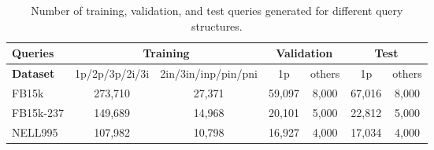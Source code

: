 \begin{table}[!h]
\caption{Average number of answers of test queries in our new dataset.}
\label{tab:meta_new_query}
\end{table}

\begin{table*}[!h]
\centering
\small
\begin{tabular}{|l|c|c|c|c|c|c|}
\hline
         \textbf{Queries} & \multicolumn{2}{c|}{\textbf{Training}} & \multicolumn{2}{c|}{\textbf{Validation}} & \multicolumn{2}{c|}{\textbf{Test}} \\ \hline
\textbf{Dataset}     & 1p/2p/3p/2i/3i               & 2in/3in/inp/pin/pni           & 1p              & others          & 1p               & others          \\ \hline
FB15k     & 273,710          & 27,371          & 59,097          & 8,000           & 67,016           & 8,000           \\ \hline
FB15k-237 & 149,689          & 14,968          & 20,101          & 5,000           & 22,812           & 5,000           \\ \hline
NELL995     & 107,982          & 10,798          & 16,927          & 4,000           & 17,034           & 4,000           \\ \hline
\end{tabular}
\caption{Number of training, validation, and test queries generated for different query structures.}
\label{tab:meta_query}
\end{table*}

